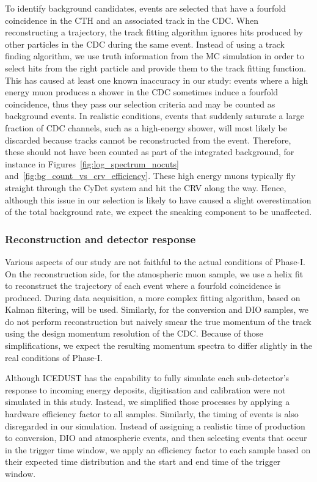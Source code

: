 To identify background candidates, events are selected that have a fourfold
coincidence in the CTH and an associated track in the CDC. When reconstructing a
trajectory, the track fitting algorithm ignores hits produced by other particles
in the CDC during the same event. Instead of using a track finding algorithm, we
use truth information from the MC simulation in order to select hits from the
right particle and provide them to the track fitting function. This has caused
at least one known inaccuracy in our study: events where a high energy muon
produces a shower in the CDC sometimes induce a fourfold coincidence, thus they
pass our selection criteria and may be counted as background events. In
realistic conditions, events that suddenly saturate a large fraction of CDC
channels, such as a high-energy shower, will most likely be discarded because
tracks cannot be reconstructed from the event. Therefore, these should not have
been counted as part of the integrated background, for instance in
Figures~\ref{fig:log_spectrum_nocuts} and~\ref{fig:bg_count_vs_crv_efficiency}.
These high energy muons typically fly straight through the CyDet system and hit
the CRV along the way. Hence, although this issue in our selection is likely to
have caused a slight overestimation of the total background rate, we expect the
sneaking component to be unaffected.

\subsubsection{Reconstruction and detector response}
Various aspects of our study are not faithful to the actual conditions of
Phase-I. On the reconstruction side, for the atmospheric muon sample, we use a
helix fit to reconstruct the trajectory of each event where a fourfold
coincidence is produced. During data acquisition, a more complex fitting
algorithm, based on Kalman filtering, will be used. Similarly, for the
conversion and DIO samples, we do not perform reconstruction but naively
smear the true momentum of the track using the design momentum resolution of the
CDC. Because of those simplifications, we expect the resulting momentum spectra
to differ slightly in the real conditions of Phase-I. 

Although ICEDUST has the capability to fully simulate each sub-detector's
response to incoming energy deposits, digitisation and calibration were not
simulated in this study. Instead, we simplified those processes by applying a
hardware efficiency factor to all samples. Similarly, the timing of events is
also disregarded in our simulation. Instead of assigning a realistic time of
production to conversion, DIO and atmospheric events, and then selecting events
that occur in the trigger time window, we apply an efficiency factor to each
sample based on their expected time distribution and the start and end time of
the trigger window. 

